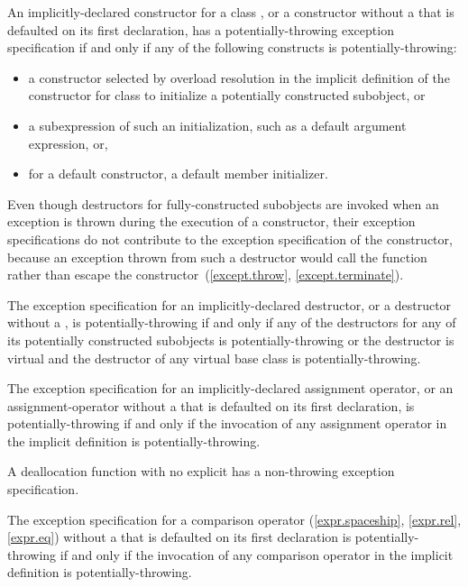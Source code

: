 \pnum
An implicitly-declared constructor for a class ,
or a constructor without a 
that is defaulted on its first declaration,
has a potentially-throwing exception specification
if and only if
any of the following constructs is potentially-throwing:

\begin{itemize}
\item
a constructor selected by overload resolution
in the implicit definition of the constructor
for class 
to initialize a potentially constructed subobject, or
\item
a subexpression of such an initialization,
such as a default argument expression, or,
\item
for a default constructor, a default member initializer.
\end{itemize}
\begin{note}
Even though destructors for fully-constructed subobjects
are invoked when an exception is thrown
during the execution of a constructor,
their exception specifications do not contribute
to the exception specification of the constructor,
because an exception thrown from such a destructor
would call the function 
rather than escape the constructor~(\ref{except.throw}, \ref{except.terminate}).
\end{note}

\pnum
The exception specification for an implicitly-declared destructor,
or a destructor without a ,
is potentially-throwing if and only if
any of the destructors
for any of its potentially constructed subobjects
is potentially-throwing or
the destructor is virtual and the destructor of any virtual base class
is potentially-throwing.

\pnum
The exception specification for an implicitly-declared assignment operator,
or an assignment-operator without a 
that is defaulted on its first declaration,
is potentially-throwing if and only if
the invocation of any assignment operator
in the implicit definition is potentially-throwing.

\pnum
A deallocation function
with no explicit 
has a non-throwing exception specification.

\pnum
The exception specification for a comparison operator
(\ref{expr.spaceship}, \ref{expr.rel}, \ref{expr.eq})
without a 
that is defaulted on its first declaration
is potentially-throwing if and only if
the invocation of any comparison operator
in the implicit definition is potentially-throwing.

